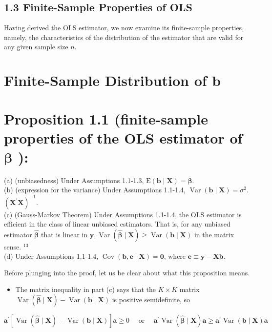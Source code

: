 \documentclass[10pt]{article}
\begin{document}
\subsection*{1.3 Finite-Sample Properties of OLS}
Having derived the OLS estimator, we now examine its finite-sample properties, namely, the characteristics of the distribution of the estimator that are valid for any given sample size $n$.

\section*{Finite-Sample Distribution of $\mathbf{b}$}
\section*{Proposition 1.1 (finite-sample properties of the OLS estimator of $\boldsymbol{\beta}$ ):}
(a) (unbiasedness) Under Assumptions 1.1-1.3, $\mathrm{E}(\mathbf{b} \mid \mathbf{X})=\boldsymbol{\beta}$.\\
(b) (expression for the variance) Under Assumptions 1.1-1.4, $\operatorname{Var}(\mathbf{b} \mid \mathbf{X})=\sigma^{2}$. $\left(\mathbf{X}^{\prime} \mathbf{X}\right)^{-1}$.\\
(c) (Gauss-Markov Theorem) Under Assumptions 1.1-1.4, the OLS estimator is efficient in the class of linear unbiased estimators. That is, for any unbiased estimator $\widehat{\boldsymbol{\beta}}$ that is linear in $\mathbf{y}, \operatorname{Var}(\widehat{\boldsymbol{\beta}} \mid \mathbf{X}) \geq \operatorname{Var}(\mathbf{b} \mid \mathbf{X})$ in the matrix sense. ${ }^{13}$\\
(d) Under Assumptions 1.1-1.4, $\operatorname{Cov}(\mathbf{b}, \mathbf{e} \mid \mathbf{X})=\mathbf{0}$, where $\mathbf{e} \equiv \mathbf{y}-\mathbf{X} \mathbf{b}$.

Before plunging into the proof, let us be clear about what this proposition means.

\begin{itemize}
  \item The matrix inequality in part (c) says that the $K \times K$ matrix $\operatorname{Var}(\widehat{\boldsymbol{\beta}} \mid \mathbf{X})- \operatorname{Var}(\mathbf{b} \mid \mathbf{X})$ is positive semidefinite, so
\end{itemize}

$$
\mathbf{a}^{\prime}[\operatorname{Var}(\widehat{\boldsymbol{\beta}} \mid \mathbf{X})-\operatorname{Var}(\mathbf{b} \mid \mathbf{X})] \mathbf{a} \geq 0 \quad \text { or } \quad \mathbf{a}^{\prime} \operatorname{Var}(\widehat{\boldsymbol{\beta}} \mid \mathbf{X}) \mathbf{a} \geq \mathbf{a}^{\prime} \operatorname{Var}(\mathbf{b} \mid \mathbf{X}) \mathbf{a}
$$
\end{document}
